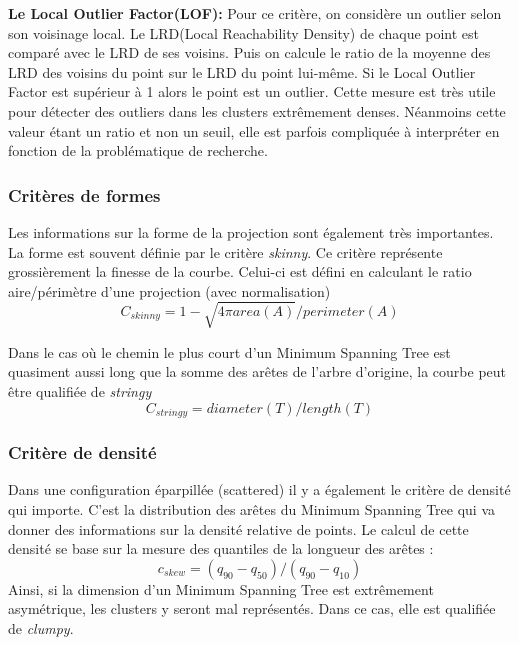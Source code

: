 \smallskip

\textbf{Le Local Outlier Factor(LOF):}
\smallskip
Pour ce critère, on considère un outlier selon son voisinage local\cite{breunig2000lof}.
Le LRD(Local Reachability Density) de chaque point est comparé avec le LRD de ses voisins. Puis on calcule le ratio de la moyenne des LRD des voisins du point sur le LRD du point lui-même. Si le Local Outlier Factor est supérieur à 1 alors le point est un outlier.
Cette mesure est très utile pour détecter des outliers dans les clusters extrêmement denses. Néanmoins cette valeur étant un ratio et non un seuil, elle est parfois compliquée à interpréter en fonction de la problématique de recherche.


\subsubsection{Critères de formes}

Les informations sur la forme de la projection sont également très importantes.\cite{wilkinson2005graph-MST}
La forme est souvent définie par le critère \textit{skinny}. Ce critère représente grossièrement la
finesse de la courbe. Celui-ci est défini en calculant le ratio aire/périmètre d’une projection
(avec normalisation) \[ C_{skinny} = 1 - \sqrt{4\pi area(A)}/perimeter(A) \]

Dans le cas où le chemin le plus court d’un Minimum Spanning Tree est quasiment aussi
long que la somme des arêtes de l’arbre d’origine, la courbe peut être qualifiée de \textit{stringy} \[C_{stringy} = diameter(T)/length(T) \]

\subsubsection{Critère de densité}
Dans une configuration éparpillée (scattered) il y a également le critère de densité qui
importe. C’est la distribution des arêtes du Minimum Spanning Tree qui va donner des
informations sur la densité relative de points.
Le calcul de cette densité se base sur la mesure des quantiles de la longueur des arêtes : 
\[c_{skew} = (q_{90}-q_{50})/(q_{90}-q_{10})\]
Ainsi, si la dimension d’un Minimum Spanning Tree est extrêmement asymétrique, les
clusters y seront mal représentés. Dans ce cas, elle est qualifiée de \textit{clumpy}. \cite{wilkinson2005graph-MST}


